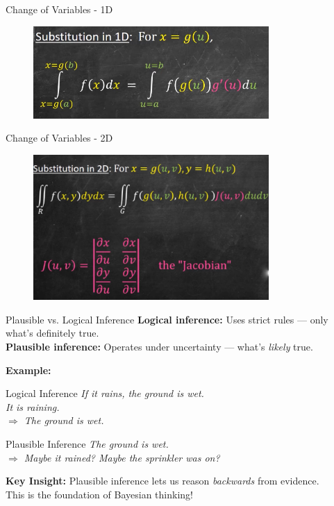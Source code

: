 \documentclass[handout,aspectratio=169]{beamer}
\begin{document}
\begin{frame}{Change of Variables - 1D}
  \begin{figure}[htbp]
		\centering
		\includegraphics[width=0.8\textwidth]{chapter_figs/01_figs/1d.png}
	\end{figure}
  
\end{frame}

\begin{frame}{Change of Variables - 2D}
  \begin{figure}[htbp]
		\centering
		\includegraphics[width=0.8\textwidth]{chapter_figs/01_figs/2d.png}
	\end{figure}
  
\end{frame}

\begin{frame}{Plausible vs. Logical Inference}
  \textbf{Logical inference:} Uses strict rules — only what’s definitely true.\\
  \textbf{Plausible inference:} Operates under uncertainty — what's \textit{likely} true.

  \vspace{1em}
  \textbf{Example:}
  \begin{block}{Logical Inference}
    \textit{If it rains, the ground is wet.\\
    It is raining.\\
    $\Rightarrow$ The ground is wet.}
  \end{block}

  \begin{block}{Plausible Inference}
    \textit{The ground is wet.\\
    $\Rightarrow$ Maybe it rained? Maybe the sprinkler was on?}
  \end{block}

  \vspace{1em}
  \textbf{Key Insight:} Plausible inference lets us reason \textit{backwards} from evidence.\\
  This is the foundation of Bayesian thinking!
\end{frame}
\end{document}
